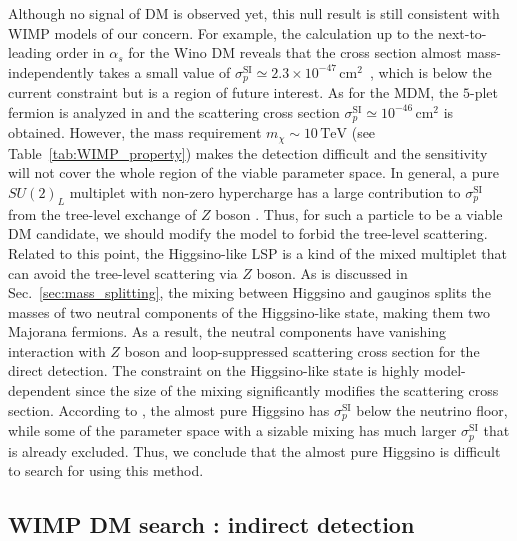 \documentclass[12pt,twoside,book]{article}
\begin{document}
Although no signal of DM is observed yet, this null result is still consistent with WIMP models of our concern.
For example, the calculation up to the next-to-leading order in $\alpha_s$ for the Wino DM reveals that the cross section almost mass-independently takes a small value of $\sigma_p^{\mathrm{SI}} \simeq 2.3 \times 10^{-47}\,\mathrm{cm}^2$~\cite{Hisano:2015rsa}, which is below the current constraint but is a region of future interest.
As for the MDM, the $5$-plet fermion is analyzed in \cite{Hisano:2011cs} and the scattering cross section $\sigma_p^{\mathrm{SI}} \simeq 10^{-46}\,\mathrm{cm}^2$ is obtained.
However, the mass requirement $m_\chi \sim 10\,\mathrm{TeV}$ (see Table~\ref{tab:WIMP_property}) makes the detection difficult and the sensitivity will not cover the whole region of the viable parameter space.
In general, a pure $SU(2)_L$ multiplet with non-zero hypercharge has a large contribution to $\sigma_p^{\mathrm{SI}}$ from the tree-level exchange of $Z$ boson \cite{Farina:2013mla}.
Thus, for such a particle to be a viable DM candidate, we should modify the model to forbid the tree-level scattering.
Related to this point, the Higgsino-like LSP is a kind of the mixed multiplet that can avoid the tree-level scattering via $Z$ boson.
As is discussed in Sec.~\ref{sec:mass_splitting}, the mixing between Higgsino and gauginos splits the masses of two neutral components of the Higgsino-like state, making them two Majorana fermions.
As a result, the neutral components have vanishing interaction with $Z$ boson and loop-suppressed scattering cross section for the direct detection.
The constraint on the Higgsino-like state is highly model-dependent since the size of the mixing significantly modifies the scattering cross section.
According to \cite{Hisano:2012wm, Roszkowski:2014wqa}, the almost pure Higgsino has $\sigma_p^{\mathrm{SI}}$ below the neutrino floor, while some of the parameter space with a sizable mixing has much larger $\sigma_p^{\mathrm{SI}}$ that is already excluded.
Thus, we conclude that the almost pure Higgsino is difficult to search for using this method.


\subsection{WIMP DM search : indirect detection}
\label{sec:indirect_detection}
\end{document}
